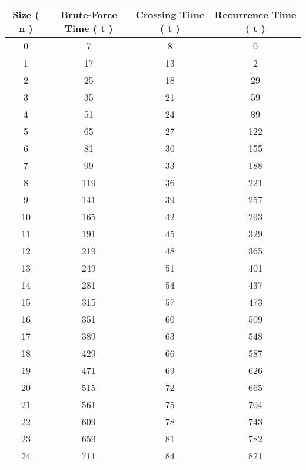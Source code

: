 \begin{center} 
\begin{tabular}[.5cm]{ c c c c } 
\toprule 
\hspace{10pt} Size ( n ) \hspace{10pt} & \hspace{10pt} Brute-Force Time ( t ) \hspace{10pt} & \hspace{10pt} Crossing Time ( t ) \hspace{10pt} & \hspace{10pt} Recurrence Time ( t ) \\ 
\midrule 
0 & 7 & 8 & 0 \\ 
\cmidrule {1-4} 
1 & 17 & 13 & 2 \\ 
\cmidrule {1-4} 
2 & 25 & 18 & 29 \\ 
\cmidrule {1-4} 
3 & 35 & 21 & 59 \\ 
\cmidrule {1-4} 
4 & 51 & 24 & 89 \\ 
\cmidrule {1-4} 
5 & 65 & 27 & 122 \\ 
\cmidrule {1-4} 
6 & 81 & 30 & 155 \\ 
\cmidrule {1-4} 
7 & 99 & 33 & 188 \\ 
\cmidrule {1-4} 
8 & 119 & 36 & 221 \\ 
\cmidrule {1-4} 
9 & 141 & 39 & 257 \\ 
\cmidrule {1-4} 
10 & 165 & 42 & 293 \\ 
\cmidrule {1-4} 
11 & 191 & 45 & 329 \\ 
\cmidrule {1-4} 
12 & 219 & 48 & 365 \\ 
\cmidrule {1-4} 
13 & 249 & 51 & 401 \\ 
\cmidrule {1-4} 
14 & 281 & 54 & 437 \\ 
\cmidrule {1-4} 
15 & 315 & 57 & 473 \\ 
\cmidrule {1-4} 
16 & 351 & 60 & 509 \\ 
\cmidrule {1-4} 
17 & 389 & 63 & 548 \\ 
\cmidrule {1-4} 
18 & 429 & 66 & 587 \\ 
\cmidrule {1-4} 
19 & 471 & 69 & 626 \\ 
\cmidrule {1-4} 
20 & 515 & 72 & 665 \\ 
\cmidrule {1-4} 
21 & 561 & 75 & 704 \\ 
\cmidrule {1-4} 
22 & 609 & 78 & 743 \\ 
\cmidrule {1-4} 
23 & 659 & 81 & 782 \\ 
\cmidrule {1-4} 
24 & 711 & 84 & 821 \\ 

\end{tabular}
\end{center}
